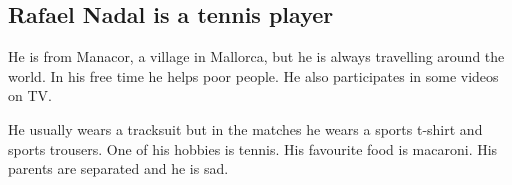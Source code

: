 %
%
\subsection*{Rafael Nadal is a tennis player}

He is from Manacor, a village in Mallorca, but he is always travelling around the world. In his free time he helps poor people. He also participates in some videos on TV.

He usually wears a tracksuit but in the matches he wears a sports t-shirt and sports trousers. One of his hobbies is tennis. His favourite food is macaroni. His parents are separated and he is sad.           



